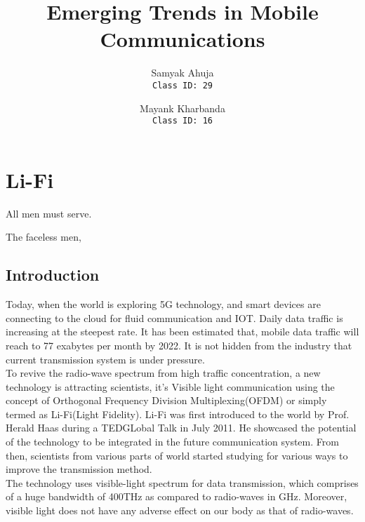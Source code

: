 \documentclass{article}
\title{Emerging Trends in Mobile Communications}
\author{
    Samyak Ahuja \\
    \texttt{Class ID: 29}
    \and
    Mayank Kharbanda \\
    \texttt{Class ID: 16}
}
\begin{document}
\maketitle

\section{Li-Fi}
\epigraph{All men must serve.}{The faceless men, \textcite{dance-with-dragons-11}}
\subsection{Introduction}
Today, when the world is exploring 5G technology, and smart devices are connecting to the cloud for fluid communication and IOT. Daily data traffic is increasing at the steepest rate. {It has been estimated that, mobile data traffic will reach to 77 exabytes per month by 2022.\textcite{cisco}} It is not hidden from the industry that current transmission system is under pressure.\\
To revive the radio-wave spectrum from high traffic concentration, a new technology is attracting scientists, it's Visible light communication using the concept of Orthogonal Frequency Division Multiplexing(OFDM) or simply termed as Li-Fi(Light Fidelity).\newline
Li-Fi was first introduced to the world by Prof. Herald Haas during a TEDGLobal Talk in July 2011. He showcased the potential of the technology to be integrated in the future communication system. From then, scientists from various parts of world started studying for various ways to improve the transmission method.\\
The technology uses visible-light spectrum for data transmission, which comprises of a huge bandwidth of 400THz as compared to radio-waves in GHz. Moreover, visible light does not have any adverse effect on our body as that of radio-waves.

\printbibliography
\end{document}
